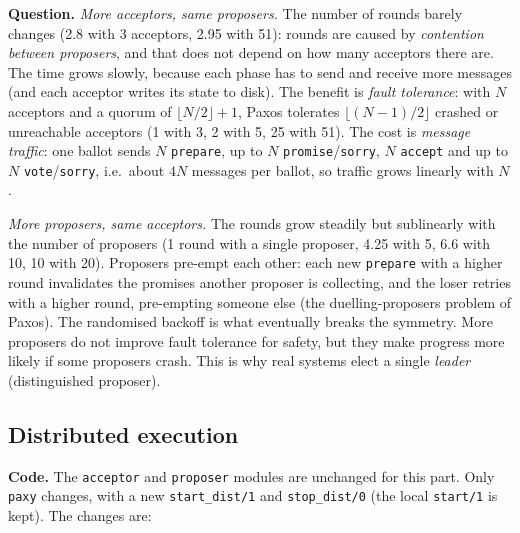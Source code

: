 \documentclass[a4paper, 10pt]{article}
\begin{document}
\textbf{Question.} \emph{More acceptors, same proposers.} The number of rounds barely changes (2.8 with 3 acceptors, 2.95 with 51): rounds are caused by \emph{contention between proposers}, and that does not depend on how many acceptors there are. The time grows slowly, because each phase has to send and receive more messages (and each acceptor writes its state to disk). The benefit is \emph{fault tolerance}: with $N$ acceptors and a quorum of $\lfloor N/2\rfloor+1$, Paxos tolerates $\lfloor (N-1)/2\rfloor$ crashed or unreachable acceptors (1 with 3, 2 with 5, 25 with 51). The cost is \emph{message traffic}: one ballot sends $N$ \texttt{prepare}, up to $N$ \texttt{promise}/\texttt{sorry}, $N$ \texttt{accept} and up to $N$ \texttt{vote}/\texttt{sorry}, i.e.\ about $4N$ messages per ballot, so traffic grows linearly with $N$.

\emph{More proposers, same acceptors.} The rounds grow steadily but sublinearly with the number of proposers (1 round with a single proposer, 4.25 with 5, 6.6 with 10, 10 with 20). Proposers pre-empt each other: each new \texttt{prepare} with a higher round invalidates the promises another proposer is collecting, and the loser retries with a higher round, pre-empting someone else (the duelling-proposers problem of Paxos). The randomised backoff is what eventually breaks the symmetry. More proposers do not improve fault tolerance for safety, but they make progress more likely if some proposers crash. This is why real systems elect a single \emph{leader} (distinguished proposer).

\subsection{Distributed execution}

\textbf{Code.} The \texttt{acceptor} and \texttt{proposer} modules are unchanged for this part. Only \texttt{paxy} changes, with a new \texttt{start\_dist/1} and \texttt{stop\_dist/0} (the local \texttt{start/1} is kept). The changes are:
\end{document}
